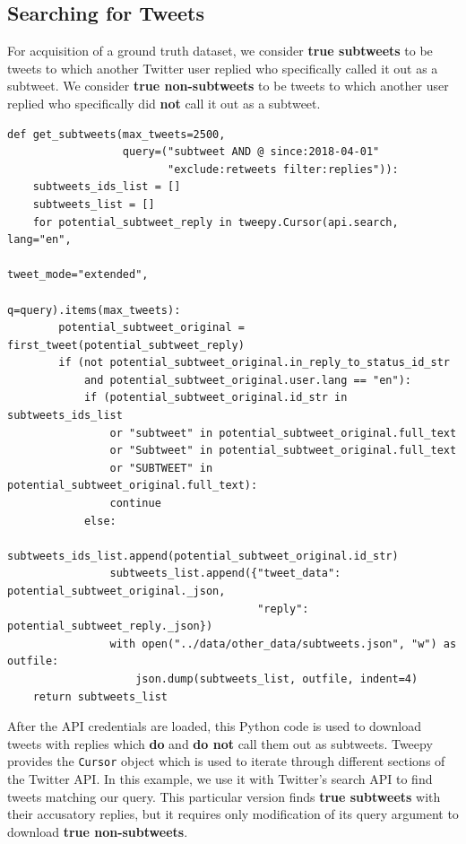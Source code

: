 \documentclass[11pt, twoside, reqno]{book}
\begin{document}
\subsection{Searching for Tweets}
\label{searching_with_api}

For acquisition of a ground truth dataset, we consider \textbf{true subtweets} to be tweets to which another Twitter user replied who specifically called it out as a subtweet. We consider \textbf{true non-subtweets} to be tweets to which another user replied who specifically did \textbf{not} call it out as a subtweet. 

\begin{verbatim}
def get_subtweets(max_tweets=2500, 
                  query=("subtweet AND @ since:2018-04-01" 
                         "exclude:retweets filter:replies")):
    subtweets_ids_list = []
    subtweets_list = []
    for potential_subtweet_reply in tweepy.Cursor(api.search, lang="en", 
                                                  tweet_mode="extended", 
                                                  q=query).items(max_tweets):
        potential_subtweet_original = first_tweet(potential_subtweet_reply)
        if (not potential_subtweet_original.in_reply_to_status_id_str 
            and potential_subtweet_original.user.lang == "en"):
            if (potential_subtweet_original.id_str in subtweets_ids_list 
                or "subtweet" in potential_subtweet_original.full_text 
                or "Subtweet" in potential_subtweet_original.full_text 
                or "SUBTWEET" in potential_subtweet_original.full_text):
                continue
            else:
                subtweets_ids_list.append(potential_subtweet_original.id_str)
                subtweets_list.append({"tweet_data": potential_subtweet_original._json, 
                                       "reply": potential_subtweet_reply._json})
                with open("../data/other_data/subtweets.json", "w") as outfile:
                    json.dump(subtweets_list, outfile, indent=4)
    return subtweets_list
\end{verbatim}
\noindent
After the API credentials are loaded, this Python code is used to download tweets with replies which \textbf{do} and \textbf{do not} call them out as subtweets. Tweepy provides the \verb|Cursor| object which is used to iterate through different sections of the Twitter API. In this example, we use it with Twitter's search API to find tweets matching our query. This particular version finds \textbf{true subtweets} with their accusatory replies, but it requires only modification of its query argument to download \textbf{true non-subtweets}. 
\end{document}
